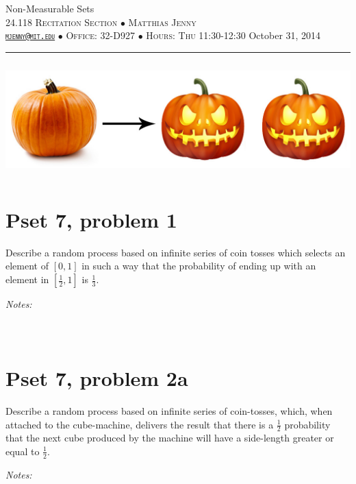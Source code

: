\documentclass[justified]{tufte-handout}
\newcommand{\HRule}{\rule{\linewidth}{0.1mm}}
\newcommand{\bfw}{\begin{fullwidth}}
\newcommand{\efw}{\end{fullwidth}}
\begin{document}
\begin{fullwidth}
\noindent\LARGE Non-Measurable Sets  \normalsize \\[.3cm]
\noindent  \textsc{24.118 Recitation Section $\bullet$ Matthias Jenny\\  {\texttt{\href{mailto:mjenny@mit.edu}{mjenny@mit.edu}}} $\bullet$ Office:  32-D927 $\bullet$ Hours: Thu 11:30-12:30} \hfill{October 31, 2014}
\noindent\HRule
\end{fullwidth}

\includegraphics[height=4.4cm]{pumpkins.jpg}

\section{Pset 7, problem 1}

\noindent \bfw Describe a random process based on infinite series of coin tosses which selects an element of $[0, 1]$ in such a way that the probability of ending up with an element in $[\frac{1}{2},1]$ is $\frac{1}{3}$.\efw

\noindent \emph{Notes:}  \underline{\hspace{15.82cm}}\\\\\underline{\hspace{16.85cm}}\\

\section{Pset 7, problem 2a}

\noindent \bfw Describe a random process based on infinite series of coin-tosses, which, when attached to the cube-machine, delivers the result that there is a $\frac{1}{2}$ probability that the next cube produced by the machine will have a side-length greater or equal to $\frac{1}{2}$.\efw

\noindent \emph{Notes:}  \underline{\hspace{15.82cm}}\\\\\underline{\hspace{16.85cm}}\\
\end{document}
